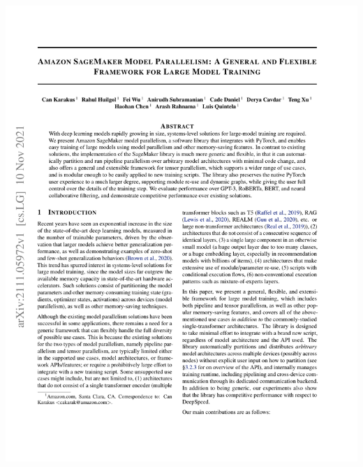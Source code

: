 \documentclass[12pt,aspectratio=169]{beamer}
\begin{document}
\begin{frame}
        \includegraphics[page=13,trim=2.5cm 14.5cm 11.5cm 11.5cm,clip,scale=1.1]{paper.pdf}
    \end{frame}
\end{document}
